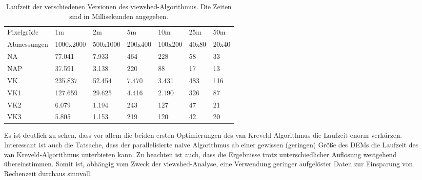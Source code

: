 \begin{table}[!ht]
\centering
\begin{tabular}{|C{2cm}|R{1.6cm}|R{1.6cm}|R{1.6cm}|R{1.6cm}|R{1.6cm}|R{1.6cm}|}
\hline
Pixelgröße & 1m & 2m & 5m & 10m & 25m & 50m \\ 
Abmessungen & 1000x2000 & 500x1000 & 200x400 & 100x200 & 40x80 & 20x40 \\ \hline
NA & 77.041 & 7.933 & 464 & 228 & 58 & 33 \\ \hline
NAP & 37.591 & 3.138 & 220 & 88 & 17 & 13 \\ \hline
VK & 235.837 & 52.454 & 7.470 & 3.431 & 483 & 116 \\ \hline
VK1 & 127.659 & 29.625 & 4.416 & 2.190 & 326 & 87 \\ \hline
VK2 & 6.079 & 1.194 & 243 & 127 & 47 & 21 \\ \hline
VK3 & 5.805 & 1.153 & 219 & 120 & 42 & 20 \\ \hline
\end{tabular}
\caption{Laufzeit der verschiedenen Versionen des viewshed-Algorithmus. Die Zeiten sind in Millisekunden angegeben.}
\label{runtimes}
\end{table}

Es ist deutlich zu sehen, dass vor allem die beiden ersten Optimierungen des van Kreveld-Algorithmus die Laufzeit enorm verkürzen. Interessant ist 
auch die Tatsache, dass der parallelisierte naive Algorithmus ab einer gewissen (geringen) Größe des DEMs die Laufzeit des van Kreveld-Algorithmus unterbieten 
kann. 
Zu beachten ist auch, dass die Ergebnisse trotz unterschiedlicher Auflösung weitgehend übereinstimmen. Somit ist, abhängig vom Zweck der viewshed-Analyse, eine Verwendung geringer aufgelöster Daten zur Einsparung von Rechenzeit durchaus sinnvoll. 